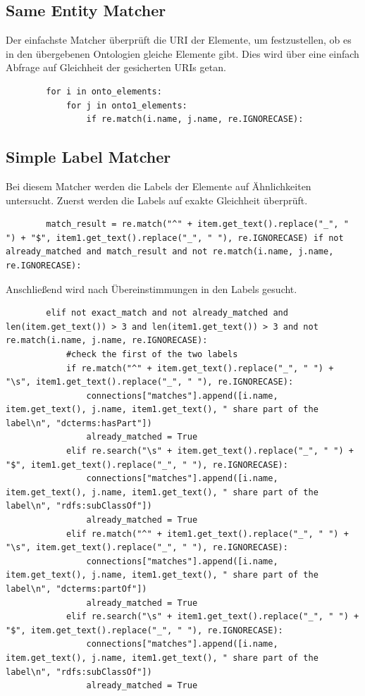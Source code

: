 		\subsection{Same Entity Matcher}
		Der einfachste Matcher überprüft die URI der Elemente, um festzustellen, ob es
		in den übergebenen Ontologien gleiche Elemente gibt. Dies wird über eine
		einfach Abfrage auf Gleichheit der gesicherten URIs getan.
		\begin{lstlisting}
		for i in onto_elements:
			for j in onto1_elements:
				if re.match(i.name, j.name, re.IGNORECASE):
		\end{lstlisting}
		
		\subsection{Simple Label Matcher}
		\label{simpleOntologyMatcher}
		Bei diesem Matcher werden die Labels der Elemente auf Ähnlichkeiten
		untersucht.
		Zuerst werden die Labels auf exakte Gleichheit überprüft.
		\begin{lstlisting}
		match_result = re.match("^" + item.get_text().replace("_", " ") + "$", item1.get_text().replace("_", " "), re.IGNORECASE) if not already_matched and match_result and not re.match(i.name, j.name, re.IGNORECASE):
		\end{lstlisting}
		Anschließend wird nach Übereinstimmungen in den Labels gesucht.
		\begin{lstlisting}
		elif not exact_match and not already_matched and len(item.get_text()) > 3 and len(item1.get_text()) > 3 and not re.match(i.name, j.name, re.IGNORECASE):
            #check the first of the two labels
            if re.match("^" + item.get_text().replace("_", " ") + "\s", item1.get_text().replace("_", " "), re.IGNORECASE):
                connections["matches"].append([i.name, item.get_text(), j.name, item1.get_text(), " share part of the label\n", "dcterms:hasPart"])
                already_matched = True
            elif re.search("\s" + item.get_text().replace("_", " ") + "$", item1.get_text().replace("_", " "), re.IGNORECASE):
                connections["matches"].append([i.name, item.get_text(), j.name, item1.get_text(), " share part of the label\n", "rdfs:subClassOf"])
                already_matched = True
            elif re.match("^" + item1.get_text().replace("_", " ") + "\s", item.get_text().replace("_", " "), re.IGNORECASE):
                connections["matches"].append([i.name, item.get_text(), j.name, item1.get_text(), " share part of the label\n", "dcterms:partOf"])
                already_matched = True
            elif re.search("\s" + item1.get_text().replace("_", " ") + "$", item.get_text().replace("_", " "), re.IGNORECASE):
                connections["matches"].append([i.name, item.get_text(), j.name, item1.get_text(), " share part of the label\n", "rdfs:subClassOf"])
                already_matched = True
		\end{lstlisting}
